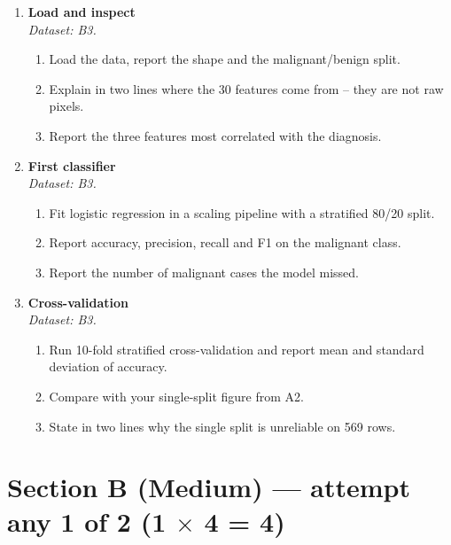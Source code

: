 \documentclass[11pt,a4paper]{article}
\begin{document}
\begin{enumerate}[label=\textbf{A\arabic*.}, leftmargin=*]

  \item \textbf{Load and inspect} \\
    \emph{Dataset: B3.}
    \begin{enumerate}[label=(\alph*), leftmargin=*]
      \item Load the data, report the shape and the malignant/benign split.
      \item Explain in two lines where the 30 features come from -- they are not raw pixels.
      \item Report the three features most correlated with the diagnosis.
    \end{enumerate}

  \item \textbf{First classifier} \\
    \emph{Dataset: B3.}
    \begin{enumerate}[label=(\alph*), leftmargin=*]
      \item Fit logistic regression in a scaling pipeline with a stratified 80/20 split.
      \item Report accuracy, precision, recall and F1 on the malignant class.
      \item Report the number of malignant cases the model missed.
    \end{enumerate}

  \item \textbf{Cross-validation} \\
    \emph{Dataset: B3.}
    \begin{enumerate}[label=(\alph*), leftmargin=*]
      \item Run 10-fold stratified cross-validation and report mean and standard deviation of accuracy.
      \item Compare with your single-split figure from A2.
      \item State in two lines why the single split is unreliable on 569 rows.
    \end{enumerate}

\end{enumerate}

\section*{Section B (Medium) --- attempt any 1 of 2 \quad (1 $\times$ 4 = 4)}
\end{document}
